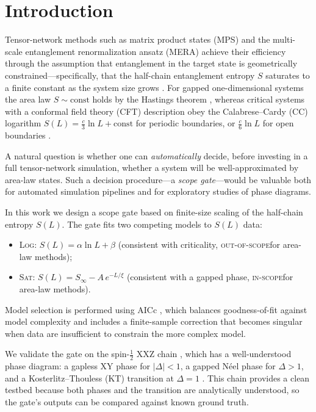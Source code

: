 \documentclass[11pt,letterpaper]{article}
\newcommand{\Sinf}{S_{\infty}}
\newcommand{\half}{\tfrac{1}{2}}
\newcommand{\Neel}{N\'{e}el}
\newcommand{\modeltag}[1]{\textsc{#1}}
\newcommand{\inscope}{\textsc{in-scope}}
\newcommand{\outscope}{\textsc{out-of-scope}}
\begin{document}
\section{Introduction}
\label{sec:intro}

Tensor-network methods such as matrix product states (MPS) and the
multi-scale entanglement renormalization ansatz (MERA) achieve their
efficiency through the assumption that entanglement in the target state is
geometrically constrained—specifically, that the half-chain entanglement
entropy $S$ saturates to a finite constant as the system size grows
\cite{Vidal2003,Vidal2007,Orus2014}.  For gapped one-dimensional systems the
area law $S \sim \text{const}$ holds by the Hastings theorem
\cite{Hastings2007}, whereas critical systems with a conformal field theory
(CFT) description obey the Calabrese–Cardy (CC) logarithm
$S(L) = \frac{c}{3}\ln L + \text{const}$ for periodic boundaries, or
$\frac{c}{6}\ln L$ for open boundaries \cite{Calabrese2004}.

A natural question is whether one can \emph{automatically} decide, before
investing in a full tensor-network simulation, whether a system will be
well-approximated by area-law states.  Such a decision procedure—a
\emph{scope gate}—would be valuable both for automated simulation pipelines
and for exploratory studies of phase diagrams.

In this work we design a scope gate based on finite-size scaling of the
half-chain entropy $S(L)$.  The gate fits two competing models to $S(L)$
data:
\begin{itemize}
  \item \modeltag{Log}: $S(L) = \alpha \ln L + \beta$ (consistent with
        criticality, \outscope for area-law methods);
  \item \modeltag{Sat}: $S(L) = \Sinf - A\,e^{-L/\xi}$ (consistent with
        a gapped phase, \inscope for area-law methods).
\end{itemize}
Model selection is performed using AICc \cite{Akaike1974,Hurvich1989}, which
balances goodness-of-fit against model complexity and includes a
finite-sample correction that becomes singular when data are insufficient
to constrain the more complex model.

We validate the gate on the spin-$\half$ XXZ chain
\cite{Bethe1931,Orbach1958,Walker1959}, which has a well-understood phase
diagram: a gapless XY phase for $|\Delta| < 1$, a gapped \Neel{} phase for
$\Delta > 1$, and a Kosterlitz–Thouless (KT) transition at $\Delta = 1$
\cite{KT1972,KT1973}.  This chain provides a clean testbed because both
phases and the transition are analytically understood, so the gate's outputs
can be compared against known ground truth.
\end{document}

